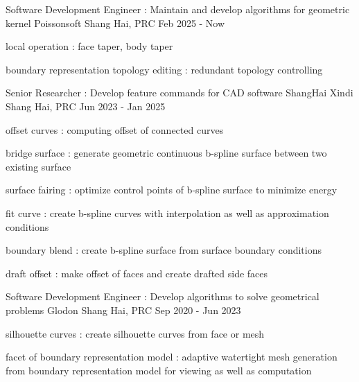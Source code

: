 
  \cventry
    {Software Development Engineer : Maintain and develop algorithms for geometric kernel } %
    {Poissonsoft} %
    {Shang Hai, PRC} %
    {Feb 2025 - Now} %
    {
      \begin{cvitems} %
         \item {local operation : face taper, body taper}    
         \item {boundary representation topology editing : redundant topology controlling}    
      \end{cvitems}
    }  

  \cventry
    {Senior Researcher : Develop feature commands for CAD software} %
    {ShangHai Xindi} %
    {Shang Hai, PRC} %
    {Jun 2023 - Jan 2025} %
    {
      \begin{cvitems} %
         \item {offset curves : computing offset of connected curves}    
         \item {bridge surface : generate geometric continuous b-spline surface between two existing surface}   
         \item {surface fairing : optimize control points of b-spline surface to minimize energy}  
         \item {fit curve : create b-spline curves with interpolation as well as approximation conditions}  
         \item {boundary blend : create b-spline surface from surface boundary conditions}  
         \item {draft offset : make offset of faces and create drafted side faces}  
      \end{cvitems}
    }  
  
  \cventry
    {Software Development Engineer : Develop algorithms to solve geometrical problems} %
    {Glodon} %
    {Shang Hai, PRC} %
    {Sep 2020 - Jun 2023} %
    {
      \begin{cvitems} %
         \item {silhouette curves : create silhouette curves from face or mesh }    
         \item {facet of boundary representation model : adaptive watertight mesh generation from boundary representation model for viewing as well as computation}  
      \end{cvitems}
    }
    
